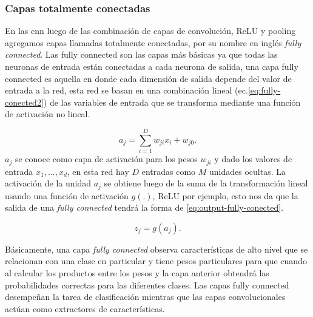 \subsubsection{Capas totalmente conectadas}\label{sub:fully_connected}

En las \ac{cnn} luego de las combinación de capas de convolución, ReLU y pooling agregamos capas llamadas totalmente conectadas, por su nombre en inglés \textit{fully connected}.
Las fully connected son las capas más básicas ya que todas las neuronas de entrada están conectadas a cada neurona de salida, una capa fully connected  es aquella en donde cada dimensión de salida  depende del valor de entrada a la red, esta red se basan en una combinación lineal (ec.\eqref{eq:fully-conected2}) de las variables de entrada que se transforma mediante una función de activación no lineal.


\begin{equation}\label{eq:fully-conected2}
a_j = \sum_{i=1}^D w_{ji}  x_i + w_{j0}.
\end{equation}
$ a_j$  se conoce como capa de activación para los pesos $w_{ji}$ y dado los valores de entrada ${x_1,...,x_d}$, en esta red hay  $ D$ entradas como $M$ unidades ocultas. La activación de la unidad  $ a_j$ se obtiene luego de la suma de la transformación lineal usando una función de activación $ g(.)$, ReLU por ejemplo, esto nos da que la salida de una \textit{fully connected} tendrá la forma de  \eqref{eq:output-fully-conected}.

\begin{equation}\label{eq:output-fully-conected}
z_j = g(a_j).
\end{equation}

Básicamente, una capa \textit{fully connected} observa características de alto nivel que se relacionan con una clase en particular y tiene pesos particulares para que cuando al calcular los productos entre los pesos y la capa anterior obtendrá las probabilidades correctas para las diferentes clases. Las capas fully connected desempeñan  la tarea de clasificación mientras que las capas convolucionales actúan como extractores de características.



